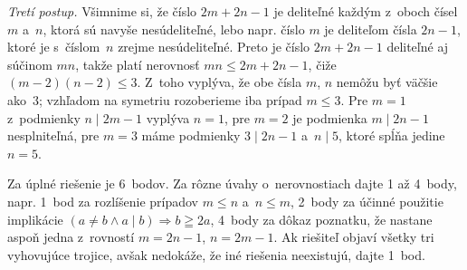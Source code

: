 {\smallskip
{\it Tretí postup.}
Všimnime si, že číslo $2m+2n-1$ je deliteľné každým z~oboch čísel
$m$ a~$n$, ktorá sú navyše nesúdeliteľné, lebo napr. číslo $m$ je
deliteľom čísla $2n-1$, ktoré je s~číslom~$n$ zrejme nesúdeliteľné.
Preto je číslo $2m+2n-1$ deliteľné aj súčinom $mn$, takže platí
nerovnosť $mn\le 2m+2n-1$, čiže $(m-2)(n-2)\le3$.
Z~toho vyplýva, že obe čísla $m$, $n$ nemôžu
byť väčšie ako~$3$; vzhľadom na symetriu rozoberieme iba prípad
$m\le3$. Pre $m=1$ z~podmienky $n\mid 2m-1$ vyplýva
$n=1$, pre $m=2$ je podmienka $m\mid 2n-1$ nesplniteľná, pre $m=3$
máme podmienky $3\mid 2n-1$ a~$n\mid 5$, ktoré spĺňa jedine
$n=5$.


\nobreak\medskip\petit\noindent
Za úplné riešenie je 6~bodov. Za rôzne
úvahy o~nerovnostiach dajte 1 až 4~body, napr. 1~bod za
rozlíšenie prípadov $m\le n$ a~$n\le m$, 2~body za účinné použitie
implikácie $(a\ne b\land a\mid b)\Rightarrow b\geqq 2a$, 4~body
za dôkaz poznatku, že nastane aspoň jedna z~rovností $m=2n-1$,
$n=2m-1$. Ak riešiteľ objaví všetky tri vyhovujúce trojice,
avšak nedokáže, že iné riešenia neexistujú, dajte 1~bod.
\endpetit
\bigbreak
}

